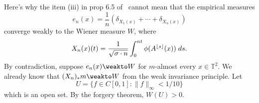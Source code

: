 \documentclass[b5paper]{article}
\begin{document}
Here's why the item (iii) in prop 6.5 of~\cite{crovisierEmpiricalMeasuresPartially2020} cannot mean that the empirical measures
\begin{equation*}
  e_n(x) = \frac{1}{n}(\delta_{X_1(x)} + \cdots + \delta_{X_n(x)})
\end{equation*}
converge weakly to the Wiener measure \(W\), where
\begin{equation*}
  X_n(x)(t) = \frac{1}{\sqrt{\sigma \cdot n}} \int_0^{nt} \phi(A^{\lfloor s\rfloor}(x)) \;ds.
\end{equation*}
By contradiction, suppose \(e_n(x) \weakto W\) for \(m\)-almost every \(x \in \mathbb{T}^{2}\). We already know that \((X_n)_*m \weakto W\) from the weak invariance principle. Let
\begin{equation*}
  U = \{ f \in C[0,1] : \lVert f \rVert_{\infty} < 1/10 \}
\end{equation*}
which is an open set. By the forgery theorem, \(W(U) > 0\).

\printbibliography
\end{document}
